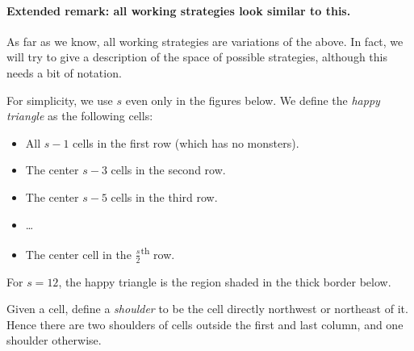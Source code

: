 \paragraph{Extended remark: all working strategies look similar to this.}
As far as we know, all working strategies are variations of the above.
In fact, we will try to give a description of the space of possible strategies,
although this needs a bit of notation.

\begin{definition*}
For simplicity, we use $s$ even only in the figures below.
We define the \emph{happy triangle} as the following cells:
\begin{itemize}
  \item All $s-1$ cells in the first row (which has no monsters).
  \item The center $s-3$ cells in the second row.
  \item The center $s-5$ cells in the third row.
  \item \dots
  \item The center cell in the $\frac s2$\textsuperscript{th} row.
\end{itemize}
\end{definition*}
For $s=12$, the happy triangle is the region shaded in the thick border below.
\begin{center}
\end{center}
\begin{definition*}
  Given a cell, define a \emph{shoulder} to be the cell directly northwest or northeast of it.
  Hence there are two shoulders of cells outside the first and last column,
  and one shoulder otherwise.
\end{definition*}

